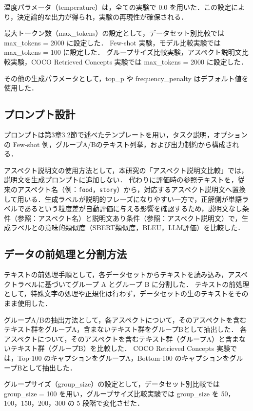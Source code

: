 温度パラメータ（temperature）は，全ての実験で 0.0 を用いた．この設定により，決定論的な出力が得られ，実験の再現性が確保される．

最大トークン数（max\_tokens）の設定として，データセット別比較では max\_tokens = 2000 に設定した．
Few-shot 実験，モデル比較実験では max\_tokens = 100 に設定した．
グループサイズ比較実験，アスペクト説明文比較実験，COCO Retrieved Concepts 実験では max\_tokens = 2000 に設定した．

その他の生成パラメータとして，top\_p や frequency\_penalty はデフォルト値を使用した．

\subsection{プロンプト設計}
プロンプトは第3章3.2節で述べたテンプレートを用い，タスク説明，オプションの Few-shot 例，グループA/Bのテキスト列挙，および出力制約から構成される．

アスペクト説明文の使用方法として，本研究の「アスペクト説明文比較」では，説明文を生成プロンプトに追加しない．
代わりに評価時の参照テキストを，従来のアスペクト名（例：\texttt{food}，\texttt{story}）から，対応するアスペクト説明文へ置換して用いる．生成ラベルが説明的フレーズになりやすい一方で，正解側が単語ラベルであるという粒度差が自動評価に与える影響を確認するため，説明文なし条件（参照：アスペクト名）と説明文あり条件（参照：アスペクト説明文）で，生成ラベルとの意味的類似度（SBERT類似度，BLEU，LLM評価）を比較した．

\subsection{データの前処理と分割方法}
\label{sec:preprocess_split}
テキストの前処理手順として，各データセットからテキストを読み込み，アスペクトラベルに基づいてグループ A とグループ B に分割した．
テキストの前処理として，特殊文字の処理や正規化は行わず，データセットの生のテキストをそのまま使用した．

グループA/Bの抽出方法として，各アスペクトについて，そのアスペクトを含むテキスト群をグループA，含まないテキスト群をグループBとして抽出した．
各アスペクトについて，そのアスペクトを含むテキスト群（グループA）と含まないテキスト群（グループB）を比較した．
COCO Retrieved Concepts 実験では，Top-100 のキャプションをグループA，Bottom-100 のキャプションをグループBとして抽出した．

グループサイズ（group\_size）の設定として，データセット別比較では group\_size = 100 を用い，グループサイズ比較実験では group\_size を 50，100，150，200，300 の 5 段階で変化させた．

